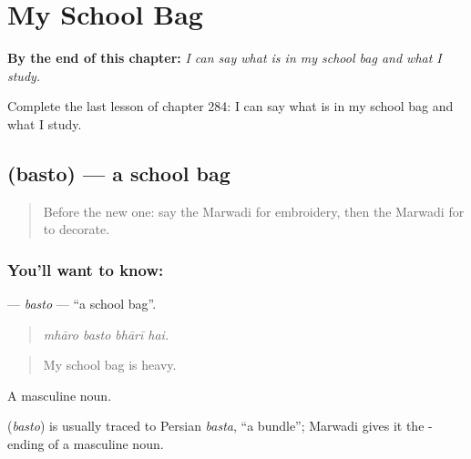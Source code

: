 
\chapter{My School Bag}
\label{ch:mw-my-school-bag}

\begin{chapteropening}
\textbf{By the end of this chapter:} \emph{I can say what is in my school bag and what I study.}

Complete the last lesson of chapter 284: I can say what is in my school bag and what I study.
\end{chapteropening}

\section[\texorpdfstring{\mw{बस्तो} (basto)}{बस्तो (basto)}]{ (basto) — a school bag}

\label{lesson:MW-C284-basto}



\begin{quote}
Before the new one: say the Marwadi for embroidery, then the Marwadi for to decorate.
\end{quote}

\subsection*{You'll want to know: }
\textbf{} — \emph{basto} — \textquotedblleft{}a school bag\textquotedblright{}.

\begin{quote}
   
\end{quote}

\begin{quote}
\emph{mhāro basto bhārī hai.}
\end{quote}

\begin{quote}
My school bag is heavy.
\end{quote}

A masculine noun.

\begin{cousinweb}
\textbf{} (\emph{basto}) is usually traced to Persian \emph{basta}, \textquotedblleft{}a bundle\textquotedblright{}; Marwadi gives it the - ending of a masculine noun.
\end{cousinweb}

